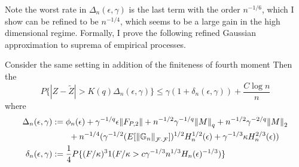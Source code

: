 \documentclass{article}
\begin{document}
Note the worst rate in $\Delta_n(\epsilon, \gamma )$ is the last term with the order $n^{-1/6}$, which I show can be refined to be $n^{-1/4}$, which seems to be a large gain in the high dimensional regime. Formally, I prove the following refined Gaussian approximation to suprema of empirical processes.
\begin{theorem}
    Consider the same setting in addition of the finiteness of fourth moment \koko 
    Then the
    \[P\{ | Z - \tilde{Z}| > K(q) \Delta _n ( \epsilon, \gamma ) \}  \leq \gamma ( 1 + \delta_n (\epsilon , \gamma )) + \frac{ C \log n}{n}\]
    where
    \begin{align*}
        \Delta_n (\epsilon, \gamma )&: = \phi_n ( \epsilon) + \gamma ^{ -1/q} \epsilon \norm{F_{P,2}} + n^{-1/2} \gamma ^{-1/q} \norm{M}_q + n^{-1/2} \gamma^{-2/q} \norm{M}_2\\
        &\qquad+ n^{-1/4} ( \gamma^{-1/2} ( E[ \norm{\mathbb{G}_n}_{ \mathcal{F}\cdot \mathcal{F}}])^{1/2} H_n^{1/2} ( \epsilon) + \gamma^{-1/3} \kappa H_n ^{2/3} ( \epsilon))\\
        \delta_n ( \epsilon, \gamma )&:= \frac{1}{4} P \{ (F/\kappa)^3 1( F/ \kappa > c \gamma ^{-1/3}n^{1/3}H_n ( \epsilon)^{-1/3}) \}
    \end{align*}
\end{theorem}
\end{document}

